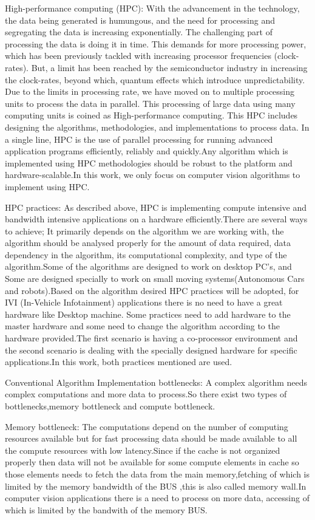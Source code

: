 High-performance computing (HPC):
With the advancement in the technology, the data being generated is humungous, and the need for processing and segregating the data is increasing exponentially. The challenging part of processing the data is doing it in time. This demands for more processing power, which has been previously tackled with increasing processor frequencies (clock-rates). But, a limit has been reached by the semiconductor industry in increasing the clock-rates, beyond which, quantum effects which introduce unpredictability. Due to the limits in processing rate, we have moved on to multiple processing units to process the data in parallel. This processing of large data using many computing units is coined as High-performance computing. This HPC includes designing the algorithms, methodologies, and implementations to process data.
    In a single line, HPC is the use of parallel processing for running advanced application programs efficiently, reliably and quickly.Any algorithm which is implemented using HPC methodologies should be robust to the platform and hardware-scalable.In this work, we only focus on computer vision algorithms to implement using HPC.

HPC practices:
As described above, HPC is implementing compute intensive and bandwidth intensive applications on a hardware efficiently.There are several ways to achieve; It primarily depends on the algorithm we are working with, the algorithm should be analysed properly for the amount of data required, data dependency in the algorithm, its computational complexity, and type of the algorithm.Some of the algorithms are designed to work on desktop PC's, and Some are designed specially to work on small moving systems(Autonomous Cars and robots).Based on the algorithm desired HPC practices will be adopted, for IVI (In-Vehicle Infotainment) applications there is no need to have a great hardware like Desktop machine.
    Some practices need to add hardware to the master hardware and some need to change the algorithm according to the hardware provided.The first scenario is having a co-processor environment and the second scenario is dealing with the specially designed hardware for specific applications.In this work, both practices mentioned are used.

Conventional Algorithm Implementation bottlenecks:
A complex algorithm needs complex computations and more data to process.So there exist two types of bottlenecks,memory bottleneck and compute bottleneck.

Memory bottleneck:
The computations depend on the number of computing resources available but for fast processing data should be made available to all the compute resources with low latency.Since if the cache is not organized properly then data will not be available for some compute elements in cache so those elements needs to fetch the data from the main memory,fetching of which is limited by the memory bandwidth of the BUS ,this is also called memory wall.In computer vision applications there is a need to process on more data, accessing of which is limited by the bandwith of the memory BUS.


